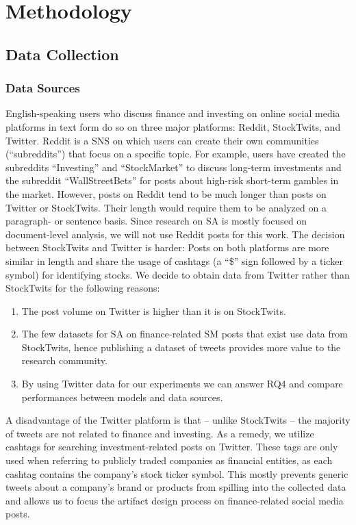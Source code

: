 \section{Methodology}
\subsection{Data Collection}
\subsubsection{Data Sources}
English-speaking users who discuss finance and investing on online social media platforms in text form do so on three major platforms: Reddit, StockTwits, and Twitter. Reddit is a SNS on which users can create their own communities (``subreddits'') that focus on a specific topic. For example, users have created the subreddits ``Investing'' and ``StockMarket'' to discuss long-term investments and the subreddit ``WallStreetBets'' for posts about high-risk short-term gambles in the market. However, posts on Reddit tend to be much longer than posts on Twitter or StockTwits. Their length would require them to be analyzed on a paragraph- or sentence basis. Since research on SA is mostly focused on document-level analysis, we will not use Reddit posts for this work. The decision between StockTwits and Twitter is harder: Posts on both platforms are more similar in length and share the usage of cashtags (a ``\$'' sign followed by a ticker symbol) for identifying stocks. We decide to obtain data from Twitter rather than StockTwits for the following reasons:
\begin{enumerate}[noitemsep]
	\item The post volume on Twitter is higher than it is on StockTwits.
	\item The few datasets for SA on finance-related SM posts that exist use data from StockTwits, hence publishing a dataset of tweets provides more value to the research community.
	\item By using Twitter data for our experiments we can answer RQ4 and compare performances between models and data sources.
\end{enumerate}

A disadvantage of the Twitter platform is that -- unlike StockTwits -- the majority of tweets are not related to finance and investing. As a remedy, we utilize cashtags for searching investment-related posts on Twitter. These tags are only used when referring to publicly traded companies as financial entities, as each cashtag contains the company's stock ticker symbol. This mostly prevents generic tweets about a company's brand or products from spilling into the collected data and allows us to focus the artifact design process on finance-related social media posts.

